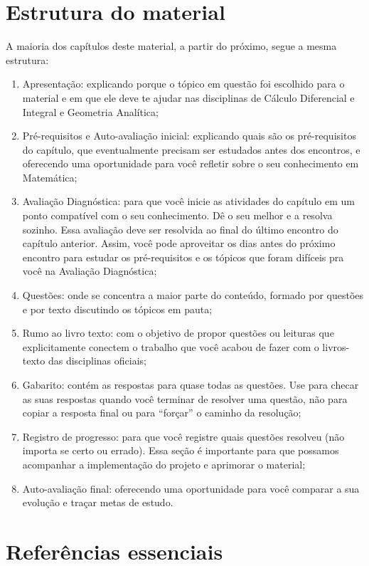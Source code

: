 \documentclass[10pt,openany,twoside=semi]{book}
\theoremstyle{estiloQuestao}
\theoremstyle{estiloQuestao}
\theoremstyle{estiloQuestao}
\theoremstyle{plain}
\theoremstyle{estiloSetinha}
\theoremstyle{estiloSetinha}
\theoremstyle{estiloSetinha}
\theoremstyle{estiloSetinha}
\begin{document}
\section{Estrutura do material}

A maioria dos capítulos deste material, a partir do próximo, segue a mesma estrutura:

\begin{enumerate}
 \item Apresentação: explicando porque o tópico em questão foi escolhido para o material e em que ele deve te ajudar nas disciplinas de Cálculo Diferencial e Integral e Geometria Analítica;
 \item Pré-requisitos e Auto-avaliação inicial: explicando quais são os pré-requisitos do capítulo, que eventualmente precisam ser estudados antes dos encontros, e oferecendo uma oportunidade para você refletir sobre o seu conhecimento em Matemática;
 \item Avaliação Diagnóstica: para que você inicie as atividades do capítulo em um ponto compatível com o seu conhecimento. Dê o seu melhor e a resolva sozinho. Essa avaliação deve ser resolvida ao final do último encontro do capítulo anterior. Assim, você pode aproveitar os dias antes do próximo encontro para estudar os pré-requisitos e os tópicos que foram difíceis pra você na Avaliação Diagnóstica;
 \item Questões: onde se concentra a maior parte do conteúdo, formado por questões e por texto discutindo os tópicos em pauta;
 \item Rumo ao livro texto: com o objetivo de propor questões ou leituras que explicitamente conectem o trabalho que você acabou de fazer com o livros-texto das disciplinas oficiais;
 \item Gabarito: contém as respostas para quase todas as questões. Use para checar as suas respostas quando você terminar de resolver uma questão, não para copiar a resposta final ou para ``forçar'' o caminho da resolução;
 \item Registro de progresso: para que você registre quais questões resolveu (não importa se certo ou errado). Essa seção é importante para que possamos acompanhar a implementação do projeto e aprimorar o material;
 \item Auto-avaliação final: oferecendo uma oportunidade para você comparar a sua evolução e traçar metas de estudo.
\end{enumerate}

\section{Referências essenciais}
\end{document}
